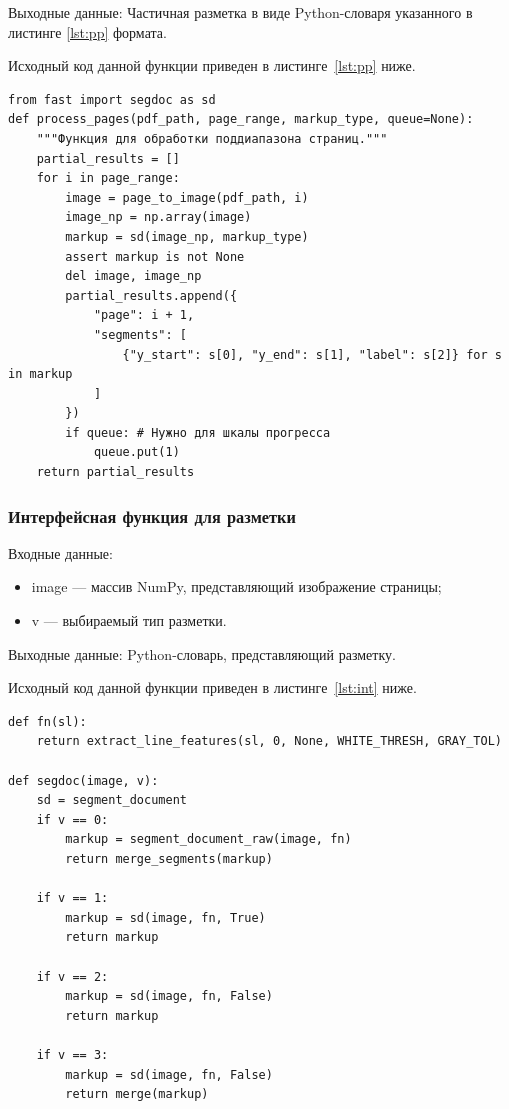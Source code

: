 Выходные данные: Частичная разметка в виде Python-словаря указанного в листинге \ref{lst:pp} формата.

Исходный код данной функции приведен в листинге~\ref{lst:pp} ниже.

\begin{lstlisting}[caption={Функция обработки страниц}, label={lst:pp}]
from fast import segdoc as sd
def process_pages(pdf_path, page_range, markup_type, queue=None):
    """Функция для обработки поддиапазона страниц."""
    partial_results = []
    for i in page_range:
        image = page_to_image(pdf_path, i)
        image_np = np.array(image)
        markup = sd(image_np, markup_type)
        assert markup is not None
        del image, image_np
        partial_results.append({
            "page": i + 1,
            "segments": [
                {"y_start": s[0], "y_end": s[1], "label": s[2]} for s in markup
            ]
        })
        if queue: # Нужно для шкалы прогресса
            queue.put(1)
    return partial_results
\end{lstlisting}

\subsubsection{Интерфейсная функция для разметки}
Входные данные:
\begin{itemize}
    \item image --- массив NumPy, представляющий изображение страницы;
    \item v --- выбираемый тип разметки.
\end{itemize}

Выходные данные: Python-словарь, представляющий разметку.

Исходный код данной функции приведен в листинге~\ref{lst:int} ниже.

\begin{lstlisting}[caption={Интерфейсная функция для разметки}, label={lst:int}]
def fn(sl):
    return extract_line_features(sl, 0, None, WHITE_THRESH, GRAY_TOL)

def segdoc(image, v):
    sd = segment_document
    if v == 0:
        markup = segment_document_raw(image, fn)
        return merge_segments(markup)

    if v == 1:
        markup = sd(image, fn, True)
        return markup

    if v == 2:
        markup = sd(image, fn, False)
        return markup

    if v == 3:
        markup = sd(image, fn, False)
        return merge(markup)
\end{lstlisting}


